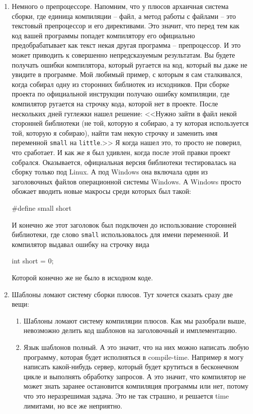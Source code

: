 \begin{enumerate}
\item %
Немного о препроцессоре.
Напомним, что у плюсов архаичная система сборки, где единица компиляции -- файл, а метод работы с файлами -- это текстовый препроцессор и его директивами.
Это значит, что перед тем как код вашей программы попадет компилятору его официально предобрабатывает как текст некая другая программа -- препроцессор.
И это может приводить к совершенно непредсказуемым результатам.
Вы будете получать ошибки компилятора, который ругается на код, который вы даже не увидите в программе.
Мой любимый пример, с которым я сам сталкивался, когда собирал одну из сторонних библиотек из исходников.
При сборке проекта по официальной инструкции получаю ошибку компиляции, где компилятор ругается на строчку кода, которой нет в проекте.
После нескольких дней гуглежки нашел решение: <<Нужно зайти в файл некой сторонней библиотеки (не той, которую я собираю, а ту которая используется той, которую я собираю), найти там некую строчку и заменить имя переменной \verb"small" на \verb"little".>> Я когда нашел это, то просто не поверил, что сработает.
И как же я был удивлен, когда после этой правки проект собрался.
Оказывается, официальная версия библиотеки тестировалась на сборку только под Linux.
А под Windows она включала один из заголовочных файлов операционной системы Windows.
А Windows просто обожает вводить новые макросы среди которых был такой:
\begin{cppcode}[numbers=none]
#define small short
\end{cppcode}
И конечно же этот заголовок был подключен до использование сторонней библиотеки, где слово \verb"small" использовалось для имени переменной.
И компилятор выдавал ошибку на строчку вида
\begin{cppcode}[numbers=none]
int short = 0;
\end{cppcode}
Которой конечно же не было в исходном коде.

\item %
Шаблоны ломают систему сборки плюсов.
Тут хочется сказать сразу две вещи:
\begin{enumerate}
\item Шаблоны ломают систему компиляции плюсов.
Как мы разобрали выше, невозможно делить код шаблонов на заголовочный и имплементацию.

\item Язык шаблонов полный.
А это значит, что на них можно написать любую программу, которая будет исполняться в compile-time.
Например я могу написать какой-нибудь сервер, который будет крутиться в бесконечном цикле и выполнять обработку запросов.
А это значит, что компилятор не может знать заранее остановится компиляция программы или нет, потому что это неразрешимая задача.
Это не так страшно, и решается time лимитами, но все же неприятно.
\end{enumerate}


\end{enumerate}
